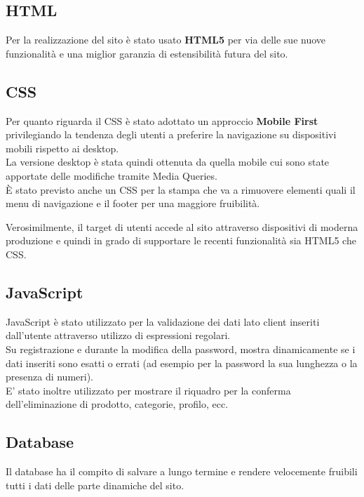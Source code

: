 \documentclass[a4paper, 11pt]{article}
\begin{document}
\subsection{HTML}
Per la realizzazione del sito è stato usato \textbf{HTML5} per via delle sue nuove funzionalità e una miglior garanzia di estensibilità futura del sito.

\subsection{CSS}
Per quanto riguarda il CSS è stato adottato un approccio \textbf{Mobile First} privilegiando la tendenza degli utenti a preferire la navigazione su dispositivi mobili rispetto ai desktop. \\
La versione desktop è stata quindi ottenuta da quella mobile cui sono state apportate delle modifiche tramite Media Queries. \\
È stato previsto anche un CSS per la stampa che va a rimuovere elementi quali il menu di navigazione e il footer per una maggiore fruibilità.

Verosimilmente, il target di utenti accede al sito attraverso dispositivi di moderna produzione e quindi in grado di supportare le recenti funzionalità sia HTML5 che CSS.

\subsection{JavaScript}
JavaScript è stato utilizzato per la validazione dei dati lato client inseriti dall’utente attraverso utilizzo di espressioni regolari.\\
Su registrazione e durante la modifica della password, mostra dinamicamente se i dati inseriti sono esatti o errati (ad esempio per la password la sua lunghezza o la presenza di numeri). \\
E’ stato inoltre utilizzato per mostrare il riquadro per la conferma dell’eliminazione di prodotto, categorie, profilo, ecc. \\


\subsection{Database}
Il database ha il compito di salvare a lungo termine e rendere velocemente fruibili tutti i dati delle parte dinamiche del sito. 
\end{document}
